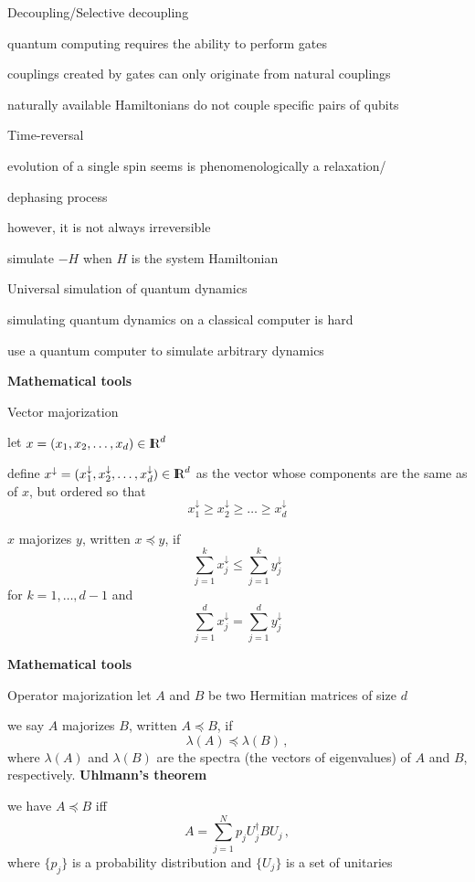 \documentclass[portrait]{seminar}
\begin{document}
\begin{slide}
{\blue Decoupling/Selective decoupling}

\quad quantum computing requires the ability to perform gates

\quad couplings created by gates can only originate from natural couplings

\quad naturally available Hamiltonians do not couple specific pairs of qubits


\vfill
{\blue Time-reversal}

\quad evolution of a single spin seems is phenomenologically a relaxation/

\quad dephasing process


\quad however, it is not always irreversible

\quad simulate $-H$ when $H$ is
the system Hamiltonian

\vfill 
{\blue Universal simulation of quantum dynamics}

\quad simulating quantum dynamics on a classical computer is hard


\quad\quad\quad use a quantum computer to simulate arbitrary dynamics
\vfill
\end{slide}

\begin{slide}
{\bf Mathematical tools}

{\blue Vector majorization}

let $x=(x_1,x_2,\ldots,x_d)\in\R^d$

define
$x^\downarrow=(x^\downarrow_1,x^\downarrow_2,\ldots,x^\downarrow_d)\in\R^d$
as the vector whose components are the same as of $x$, but ordered so that
\[
x^\downarrow_1\ge x^\downarrow_2\ge\ldots\ge x^\downarrow_d
\]

{\blue $x$ majorizes $y$}, written {\blue $x\preceq y$}, if
\[
\sum_{j=1}^k x^\downarrow_j \le \sum_{j=1}^k y^\downarrow_j
\]
for $k=1,\ldots,d-1$ and 
\[
\sum_{j=1}^d x^\downarrow_j = \sum_{j=1}^d y^\downarrow_j
\]
\end{slide}

\begin{slide}
{\bf Mathematical tools} 

{\blue Operator majorization}
\vfill
let $A$ and $B$ be two Hermitian matrices of size $d$

we say {\blue $A$ majorizes $B$}, written {\blue $A\preceq B$}, if
\[
\lambda(A)\preceq\lambda(B)\,,
\]
where $\lambda(A)$ and $\lambda(B)$ are the spectra (the vectors of
eigenvalues) of $A$ and $B$, respectively.
\vfill
{\bf Uhlmann's theorem} 

we have $A\preceq B$ iff
\[
A=\sum_{j=1}^N p_j U_j^\dagger B U_j\,,
\]
where $\{p_j\}$ is a probability distribution and $\{U_j\}$ is a set
of unitaries
\vfill
\end{slide}
\end{document}
